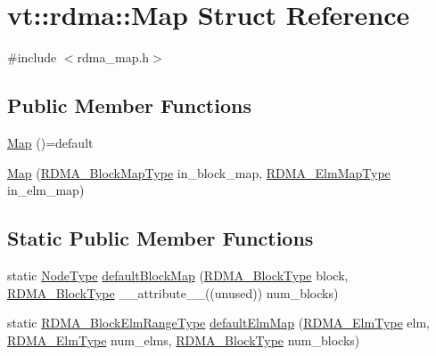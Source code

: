 \hypertarget{structvt_1_1rdma_1_1_map}{}\section{vt\+:\+:rdma\+:\+:Map Struct Reference}
\label{structvt_1_1rdma_1_1_map}


{\ttfamily \#include $<$rdma\+\_\+map.\+h$>$}

\subsection*{Public Member Functions}
\begin{DoxyCompactItemize}
\item 
\hyperlink{structvt_1_1rdma_1_1_map_a20781151e2a256532d75bda5d42f4685}{Map} ()=default
\item 
\hyperlink{structvt_1_1rdma_1_1_map_aa87802218cedbb5485a286199eed3489}{Map} (\hyperlink{namespacevt_1_1rdma_a049e294a5236ad30692253d5f82886c9}{R\+D\+M\+A\+\_\+\+Block\+Map\+Type} in\+\_\+block\+\_\+map, \hyperlink{namespacevt_1_1rdma_a6798ab36a5dcb8749c25dff719f9ce07}{R\+D\+M\+A\+\_\+\+Elm\+Map\+Type} in\+\_\+elm\+\_\+map)
\end{DoxyCompactItemize}
\subsection*{Static Public Member Functions}
\begin{DoxyCompactItemize}
\item 
static \hyperlink{namespacevt_a866da9d0efc19c0a1ce79e9e492f47e2}{Node\+Type} \hyperlink{structvt_1_1rdma_1_1_map_a8a37b9b72187246a37d025be09e7f6c5}{default\+Block\+Map} (\hyperlink{namespacevt_ae54d2ca8f6bb4d65faf65118c82cd6f7}{R\+D\+M\+A\+\_\+\+Block\+Type} block, \hyperlink{namespacevt_ae54d2ca8f6bb4d65faf65118c82cd6f7}{R\+D\+M\+A\+\_\+\+Block\+Type} \+\_\+\+\_\+attribute\+\_\+\+\_\+((unused)) num\+\_\+blocks)
\item 
static \hyperlink{namespacevt_1_1rdma_a8320f97b4a2866df60d9778486dbcd0f}{R\+D\+M\+A\+\_\+\+Block\+Elm\+Range\+Type} \hyperlink{structvt_1_1rdma_1_1_map_aebbab4065afa91396bd259001fbd4744}{default\+Elm\+Map} (\hyperlink{namespacevt_a2c2a902092b72056f70210c159f966f0}{R\+D\+M\+A\+\_\+\+Elm\+Type} elm, \hyperlink{namespacevt_a2c2a902092b72056f70210c159f966f0}{R\+D\+M\+A\+\_\+\+Elm\+Type} num\+\_\+elms, \hyperlink{namespacevt_ae54d2ca8f6bb4d65faf65118c82cd6f7}{R\+D\+M\+A\+\_\+\+Block\+Type} num\+\_\+blocks)
\end{DoxyCompactItemize}
